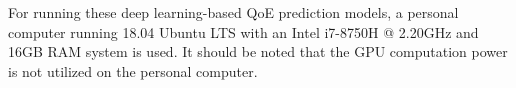 For running these deep learning-based QoE prediction models, a personal computer running 18.04 Ubuntu LTS with an Intel i7-8750H @ 2.20GHz and 16GB RAM system is used.
It should be noted that the GPU computation power is not utilized on the personal computer.
